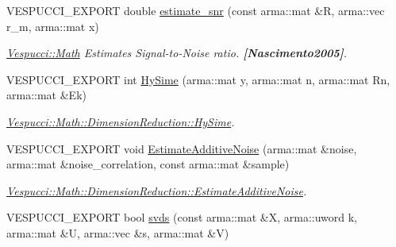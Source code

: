 \begin{DoxyCompactItemize}
V\+E\+S\+P\+U\+C\+C\+I\+\_\+\+E\+X\+P\+O\+RT double \hyperlink{namespace_vespucci_1_1_math_1_1_dimension_reduction_a37f3a4278bbdfba337f4e776f7d0916b}{estimate\+\_\+snr} (const arma\+::mat \&R, arma\+::vec r\+\_\+m, arma\+::mat x)
\begin{DoxyCompactList}\small\item\em \hyperlink{namespace_vespucci_1_1_math}{Vespucci\+::\+Math} Estimates Signal-\/to-\/\+Noise ratio. {\bfseries [Nascimento2005]}. \end{DoxyCompactList}\item 
V\+E\+S\+P\+U\+C\+C\+I\+\_\+\+E\+X\+P\+O\+RT int \hyperlink{namespace_vespucci_1_1_math_1_1_dimension_reduction_a355295f13e2a14e990b22eb96a33db5c}{Hy\+Sime} (arma\+::mat y, arma\+::mat n, arma\+::mat Rn, arma\+::mat \&Ek)
\begin{DoxyCompactList}\small\item\em \hyperlink{namespace_vespucci_1_1_math_1_1_dimension_reduction_a355295f13e2a14e990b22eb96a33db5c}{Vespucci\+::\+Math\+::\+Dimension\+Reduction\+::\+Hy\+Sime}. \end{DoxyCompactList}\item 
V\+E\+S\+P\+U\+C\+C\+I\+\_\+\+E\+X\+P\+O\+RT void \hyperlink{namespace_vespucci_1_1_math_1_1_dimension_reduction_ac96e3dc096295499724e3ecbb63a3f57}{Estimate\+Additive\+Noise} (arma\+::mat \&noise, arma\+::mat \&noise\+\_\+correlation, const arma\+::mat \&sample)
\begin{DoxyCompactList}\small\item\em \hyperlink{namespace_vespucci_1_1_math_1_1_dimension_reduction_ac96e3dc096295499724e3ecbb63a3f57}{Vespucci\+::\+Math\+::\+Dimension\+Reduction\+::\+Estimate\+Additive\+Noise}. \end{DoxyCompactList}\item 
V\+E\+S\+P\+U\+C\+C\+I\+\_\+\+E\+X\+P\+O\+RT bool \hyperlink{namespace_vespucci_1_1_math_1_1_dimension_reduction_aebb6fc52c28c84d321c63de22b1f5f9f}{svds} (const arma\+::mat \&X, arma\+::uword k, arma\+::mat \&U, arma\+::vec \&s, arma\+::mat \&V)

\end{DoxyCompactItemize}
